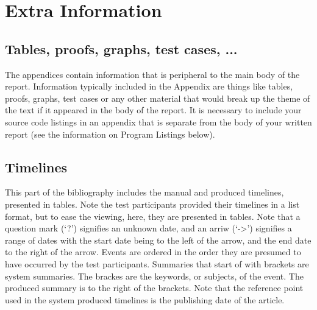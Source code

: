 \chapter{Extra Information}
\section{Tables, proofs, graphs, test cases, ...}
The appendices contain information that is peripheral to the main body of the report. Information typically included in the Appendix are things like tables, proofs, graphs, test cases or any other material that would break up the theme of the text if it appeared in the body of the report. It is necessary to include your source code listings in an appendix that is separate from the body of your written report (see the information on Program Listings below).

\section{Timelines}
\par This part of the bibliography includes the manual and produced timelines, presented in tables. Note the test participants provided their timelines in a list format, but to ease the viewing, here, they are presented in tables. Note that a question mark (`?') signifies an unknown date, and an arriw (`->') signifies a range of dates with the start date being to the left of the arrow, and the end date to the right of the arrow. Events are ordered in the order they are presumed to have occurred by the test participants. Summaries that start of with brackets are system summaries. The brackes are the keywords, or subjects, of the event. The produced summary is to the right of the brackets. Note that the reference point used in the system produced timelines is the publishing date of the article.
